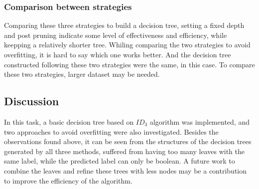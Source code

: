 \documentclass[11pt]{article}
\begin{document}
\subsubsection{Comparison between strategies}
Comparing these three strategies to build a decision tree, setting a fixed depth and post pruning indicate some level of effectiveness and efficiency, while keepping a relatively shorter tree. Whiling comparing the two strategies to avoid overfitting, it is hard to say which one works better. And the decision tree constructed following these two strategies were the same, in this case. To compare these two strategies, larger dataset may be needed.

\subsection{Discussion}
In this task, a basic decision tree based on \(ID_3\) algorithm was implemented, and two approaches to avoid overfitting were also investigated. Besides the observations found above, it can be seen from the structures of the decision trees generated by all three methods, suffered from having too many leaves with the same label, while the predicted label can only be boolean. A future work to combine the leaves and refine these trees with less nodes may be a contribution to improve the efficiency of the algorithm.

%
%
\end{document}
